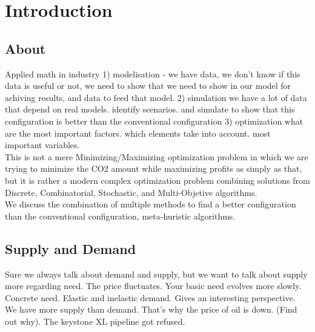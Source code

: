 \documentclass[12pt]{article}
\begin{document}
\maketitle


\tableofcontents
\newpage

\section{Introduction}

\subsection{About}
Applied math in industry
1) modelisation
  - we have data, we don't know if this data is useful or not, we need to show that we
need to show in our model for achiving results, and data to feed that model. 
2) simulation
we have a lot of data that depend on real models. identify scenarios. and simulate to 
show that this configuration is better than the conventional configuration 
3) optimization 
what are the most important factors. which elements take into account. most important
variables. \\

This is not a mere Minimizing/Maximizing optimization problem in which we are trying to minimize the CO2 amount while maximizing profits as simply as that, but it is rather
a modern complex optimization problem combining solutions from Discrete, Combinatorial,
Stochastic, and Multi-Objetive algorithms. \\

We discuss the combination of multiple methods to find a better configuration than
the conventional configuration, meta-huristic algorithms. 

\subsection{Supply and Demand}
Sure we always talk about demand and supply, but we want to talk about supply more regarding need. The price fluctuates. Your basic need evolves more slowly. Concrete need. Elastic and inelastic demand. Gives an interesting perspective. \\

We have more supply than demand. That's why the price of oil is down. (Find out why). The keystone XL pipeline got refused.\\
\end{document}

